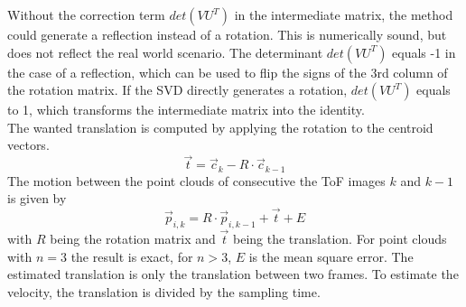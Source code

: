 Without the correction term $det(VU^{T})$ in the intermediate matrix, the method could generate a reflection instead of a rotation. This is numerically sound, but does not reflect the real world scenario. The determinant $det(VU^{T})$ equals -1 in the case of a reflection, which can be used to flip the signs of the 3rd column of the rotation matrix. If the SVD directly generates a rotation, $det(VU^{T})$ equals to 1, which transforms the intermediate matrix into the identity.\\
The wanted translation is computed by applying the rotation to the centroid vectors. 
\begin{equation*}
    \vec{t} = \vec{c}_{k}-R\cdot\vec{c}_{k-1}
\end{equation*}
The motion between the point clouds of consecutive the ToF images $k$ and $k-1$ is given by
\begin{equation*}
    \vec{p}_{i,k} = R\cdot\vec{p}_{i,k-1}+\vec{t}+E
\end{equation*}
with $R$ being the rotation matrix and $\vec{t}$ being the translation. For point clouds with $n=3$ the result is exact, for $n>3$, $E$ is the mean square error\cite{SVD_ETH}.
The estimated translation is only the translation between two frames. To estimate the velocity, the translation is divided by the sampling time.

